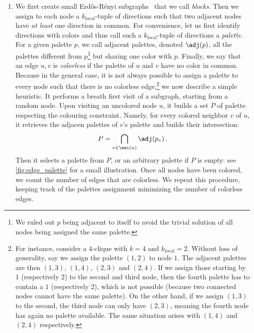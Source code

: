 \begin{enumerate}[1),leftmargin=*]
\item
We first create small Erdős-Rényi
subgraphs~\autocites{erdos1959random}{gilbertRG59} that we call \emph{blocks}. Then we
assign to each node a $k_\mathrm{local}$-tuple of
directions such that two adjacent nodes have \emph{at least} one direction in common.
For convenience, let us first identify directions with colors and
thus call such a $k_\mathrm{local}$-tuple of directions a \emph{palette}. For a given palette $p$,
we call adjacent palettes, denoted $\adj(p)$, all the palettes different from $p$\footnote{We ruled
out $p$ being adjacent to itself to avoid the trivial solution of all nodes being assigned the same
palette.} but sharing one
color with $p$. Finally, we say that an edge $u,v$ is \emph{colorless} if the palette of $u$ and $v$ have
no color in common. Because in the general case, it is not always possible to assign a palette to
every node such that there is no colorless edge,\footnote{For instance, consider a $4$-clique with $k=4$
and $k_\mathrm{local}=2$. Without loss of generality, say we assign the palette $(1,2)$ to node
$1$. The adjacent palettes are then $(1,3)$, $(1,4)$, $(2,3)$ and $(2,4)$. If we assign those
starting by $1$ (respectively $2$) to the second and third node, then the fourth palette has to
contain a $1$ (respectively $2$), which is not possible (because two connected nodes cannot have the
same palette). On the other hand, if we assign $(1,3)$ to the second, the third node can only have
$(2,3)$, meaning the fourth node has again no palette available. The same situation arises with $(1,4)$ and
$(2,4)$ respectively.} we now describe a simple heuristic. It performs a breath first visit of a subgraph,
starting from a random node. Upon visiting an uncolored node $u$, it builds a set $P$ of palette
respecting the colouring constraint. Namely, for every colored neighbor $v$ of $u$, it retrieves the
adjacen palettes of $v$'s palette and builds their intersection:
\begin{equation*}
  P=\bigcap_{v\in \nei(u)} \adj(p_v)\,.
\end{equation*}
Then it selects \uar{} a palette from $P$, or an arbitrary palette if $P$ is empty: see
\autoref{fig:edge_palette} for a small illustration. Once all nodes have been colored, we count the
number of edges that are colorless. We repeat this procedure, keeping track of the palettes assignment
minimizing the number of colorless edges.
\begin{figure}[ht]
  \centering

\end{figure}
\end{enumerate}
